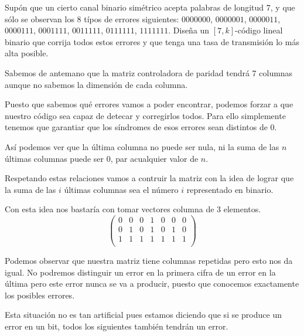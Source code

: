 \begin{problem}[11]
 Supón que un cierto canal binario simétrico acepta palabras
de longitud $7$, y que sólo se observan los $8$ típos de errores
siguientes: $0000000$, $0000001$, $0000011$, $0000111$, $0001111$,
$0011111$, $0111111$, $1111111$. Diseña un $[7,k]$-código lineal
binario que corrija todos estos errores y que tenga una tasa de
transmisión lo más alta posible.
\solution

Sabemos de antemano que la matriz controladora de paridad tendrá 7 columnas aunque no sabemos la dimensión de cada columna.

Puesto que sabemos qué errores vamos a poder encontrar, podemos forzar a que nuestro código sea capaz de detecar y corregirlos todos. Para ello simplemente tenemos que garantiar que los síndromes de esos errores sean distintos de 0.

Así podemos ver que la última columna no puede ser nula, ni la suma de las $n$ últimas columnas puede ser 0, par acualquier valor de $n$.

Respetando estas relaciones vamos a contruir la matriz con la idea de lograr que la suma de las $i$ últimas columnas sea el número $i$ representado en binario.

Con esta idea nos bastaría con tomar vectores columna de 3 elementos.
\[\left( \begin{array}{ccccccc}
0 & 0 & 0 & 1 & 0 & 0 & 0 \\
0 & 1 & 0 & 1 & 0 & 1 & 0 \\
1 & 1 & 1 & 1 & 1 & 1 & 1 \\
\end{array}\right)\]

Podemos observar que nuestra matriz tiene columnas repetidas pero esto nos da igual. No podremos distinguir un error en la primera cifra de un error en la última pero este error nunca se va a producir, puesto que conocemos exactamente los posibles errores.

\obs Esta situación no es tan artificial pues estamos diciendo que si se produce un error en un bit, todos los siguientes también tendrán un error.

\end{problem}

